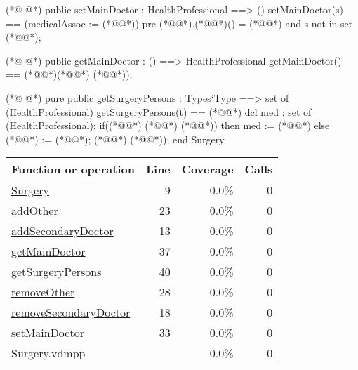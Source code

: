 \begin{vdmpp}[breaklines=true]
(*@
\label{setMainDoctor:33}
@*)
 public setMainDoctor : HealthProfessional ==> ()
  setMainDoctor(s) == (medicalAssoc := (*@@*))
 pre (*@@*).(*@@*)() = (*@@*) and s not in set (*@@*);
 
(*@
\label{getMainDoctor:37}
@*)
 public getMainDoctor : () ==> HealthProfessional
  getMainDoctor() == (*@\vdmnotcovered{(}@*)(*@@*) (*@@*));

(*@
\label{getSurgeryPersons:40}
@*)
 pure public getSurgeryPersons : Types`Type ==> set of (HealthProfessional)
  getSurgeryPersons(t) == (*@\vdmnotcovered{(}@*)
               dcl med : set of (HealthProfessional);
               if((*@@*) (*@\vdmnotcovered{=}@*) (*@@*))
                then med := (*@@*)
               else
                (*@@*) := (*@@*);
               (*@@*) (*@@*));
end Surgery
\end{vdmpp}
\bigskip
\begin{longtable}{|l|r|r|r|}
\hline
Function or operation & Line & Coverage & Calls \\
\hline
\hline
\hyperref[Surgery:9]{Surgery} & 9&0.0\% & 0 \\
\hline
\hyperref[addOther:23]{addOther} & 23&0.0\% & 0 \\
\hline
\hyperref[addSecondaryDoctor:13]{addSecondaryDoctor} & 13&0.0\% & 0 \\
\hline
\hyperref[getMainDoctor:37]{getMainDoctor} & 37&0.0\% & 0 \\
\hline
\hyperref[getSurgeryPersons:40]{getSurgeryPersons} & 40&0.0\% & 0 \\
\hline
\hyperref[removeOther:28]{removeOther} & 28&0.0\% & 0 \\
\hline
\hyperref[removeSecondaryDoctor:18]{removeSecondaryDoctor} & 18&0.0\% & 0 \\
\hline
\hyperref[setMainDoctor:33]{setMainDoctor} & 33&0.0\% & 0 \\
\hline
\hline
Surgery.vdmpp & & 0.0\% & 0 \\
\hline
\end{longtable}

